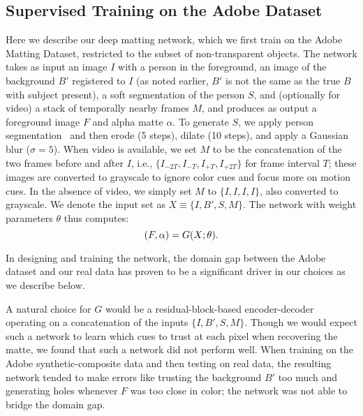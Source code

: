 \documentclass[10pt,twocolumn,letterpaper]{article}
\begin{document}
\subsection{Supervised Training on the Adobe Dataset}
\label{sec:sup_train}
Here we describe our deep matting network, which we first train on the Adobe Matting Dataset, restricted to the subset of non-transparent objects.  The network takes as input an image $I$ with a person in the foreground, an image of the background $B'$ registered to $I$ (as noted earlier, $B'$ is not the same as the true $B$ with subject present), a soft segmentation of the person $S$, and (optionally for video) a stack of temporally nearby frames $M$, and produces as output a foreground image $F$ and alpha matte $\alpha$.  To generate $S$, we apply person segmentation~\cite{deeplabv3plus2018} and then erode (5 steps), dilate (10 steps), and apply a Gaussian blur ($\sigma=5$).  When video is available, we set $M$ to be the concatenation of the two frames before and after $I$, i.e., $\{I_{-2T},I_{-T},I_{+T},I_{+2T}\}$ for frame interval $T$; these images are converted to grayscale to ignore color cues and focus more on motion cues. In the absence of video, we simply set $M$ to $\{I,I,I,I\}$, also converted to grayscale.  We denote the input set as $X \equiv \{I,B',S,M\}$. The network with weight parameters $\theta$ thus computes:
\vspace{-0.5em}
\begin{equation}
\label{eq:setup}
(F, \alpha)  = G(X;\theta).
\vspace{-0.5em}
\end{equation}


In designing and training the network, the domain gap between the Adobe dataset and our real data has proven to be a significant driver in our choices as we describe below.

A natural choice for $G$ would be a residual-block-based encoder-decoder~\cite{zhu2017unpaired} operating on a concatenation of the inputs $\{I,B',S,M\}$.  Though we would expect such a network to learn which cues to trust at each pixel when recovering the matte, we found that such a network did not perform well.  When training on the Adobe synthetic-composite data and then testing on real data, the resulting network tended to make errors like trusting the background $B'$ too much and generating holes whenever $F$ was too close in color; the network was not able to bridge the domain gap.
\end{document}
